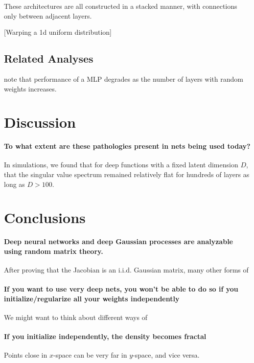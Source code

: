 \documentclass{article}
\begin{document}
These architectures are all constructed in a stacked manner, with connections only between adjacent layers.


[Warping a 1d uniform distribution]


\subsection{Related Analyses}

\cite{montavon2010layer} note that performance of a MLP degrades as the number of layers with random weights increases.

\section{Discussion}

\paragraph{To what extent are these pathologies present in nets being used today?}  In simulations, we found that for deep functions with a fixed latent dimension $D$, that the singular value spectrum remained relatively flat for hundreds of layers as long as $D > 100$.


\section{Conclusions}

\paragraph{Deep neural networks and deep Gaussian processes are analyzable using random matrix theory.}  After proving that the Jacobian is an i.i.d. Gaussian matrix, many other forms of 

\paragraph{If you want to use very deep nets, you won't be able to do so if you initialize/regularize all your weights independently}  We might want to think about different ways of 

\paragraph{If you initialize independently, the density becomes fractal} Points close in $x$-space can be very far in $y$-space, and vice versa.
\end{document}
